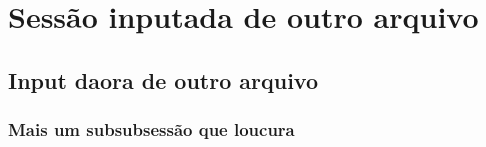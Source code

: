 \section{Sessão inputada de outro arquivo}
\begin{center}
    \blindtext[1]
\end{center}
\subsection{Input daora de outro arquivo}
\begin{tiny}
    \blindtext[1]
\end{tiny}
\subsubsection{Mais um subsubsessão que loucura}
\begin{small}
    \blindtext[1]
\end{small}
